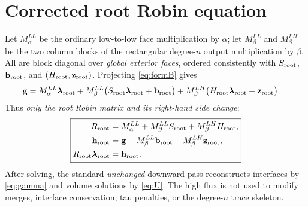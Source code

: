 \documentclass[11pt,letterpaper]{article}
\newcommand{\lam}{\boldsymbol\lambda}
\newcommand{\bb}{\mathbf b}
\newcommand{\zz}{\mathbf z}
\newcommand{\gvec}{\mathbf g}
\begin{document}
\section{Corrected root Robin equation}
Let \(M_\alpha^{LL}\) be the ordinary low-to-low face multiplication by \(\alpha\); let \(M_\beta^{LL}\) and \(M_\beta^{LH}\) be the two column blocks of the rectangular degree-\(n\) output multiplication by \(\beta\). All are block diagonal over \emph{global exterior faces}, ordered consistently with \(S_{\rm root}\), \(\bb_{\rm root}\), and \((H_{\rm root},\zz_{\rm root})\). Projecting \eqref{eq:formB} gives
\begin{align}\label{eq:rootrobinexpanded}
 \gvec
 &=M_\alpha^{LL}\lam_{\rm root}
  +M_\beta^{LL}\bigl(S_{\rm root}\lam_{\rm root}+\bb_{\rm root}\bigr)
  +M_\beta^{LH}\bigl(H_{\rm root}\lam_{\rm root}+\zz_{\rm root}\bigr).
\end{align}
Thus \emph{only the root Robin matrix and its right-hand side change}:
\begin{equation}\label{eq:rootrobinboxed}
 \boxed{\begin{aligned}
 R_{\rm root}
  &=M_\alpha^{LL}+M_\beta^{LL}S_{\rm root}
     +M_\beta^{LH}H_{\rm root},\\
 \mathbf h_{\rm root}
  &=\gvec-M_\beta^{LL}\bb_{\rm root}
     -M_\beta^{LH}\zz_{\rm root},\\
 R_{\rm root}\lam_{\rm root}&=\mathbf h_{\rm root}.
 \end{aligned}}
\end{equation}
After solving, the standard \emph{unchanged} downward pass reconstructs interfaces by \eqref{eq:gamma} and volume solutions by \eqref{eq:U}. The high flux is not used to modify merges, interface conservation, tau penalties, or the degree-\(n\) trace skeleton.
\end{document}
